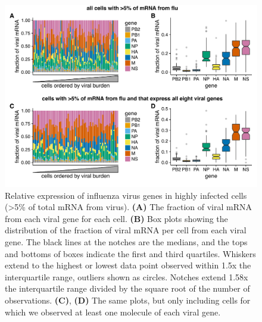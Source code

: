 \documentclass[9pt,lineno]{elife}
\begin{document}
\begin{figure}
\centerline{\includegraphics[width=0.9\linewidth]{figures/p_flu_expr_manualedits.pdf}}
\caption{\label{fig:fluexpr}
Relative expression of influenza virus genes in highly infected cells (>5\% of total mRNA from virus).
{\bf (A)} 
The fraction of viral mRNA from each viral gene for each cell. 
{\bf (B)}
Box plots showing the distribution of the fraction of viral mRNA per cell from each viral gene.
The black lines at the notches are the medians, and the tops and bottoms of boxes indicate the first and third quartiles.
Whiskers extend to the highest or lowest data point observed within 1.5x the interquartile range, outliers shown as circles.
Notches extend 1.58x the interquartile range divided by the square root of the number of observations. 
{\bf (C)}, {\bf (D)} 
The same plots, but only including cells for which we observed at least one molecule of each viral gene.
}
\end{figure}
\end{document}
